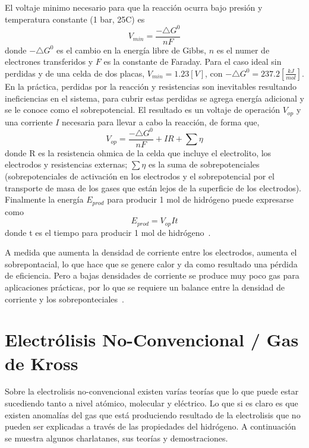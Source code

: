 \documentclass[12pt,twoside,onecolumn]{article}
\begin{document}
El voltaje minimo necesario para que la reacción ocurra bajo presión y temperatura constante (1 bar, 25C) es
\begin{equation}
V_{min} = \frac{-\triangle G^0}{nF} 
\end{equation}
donde $-\triangle G^0$ es el cambio en la energía libre de Gibbs, $n$ es el numer de electrones transferidos y $F$ es la constante de Faraday. Para el caso ideal sin perdidas y de una celda de dos placas, $V_{min}=1.23 [V]$, con $-\triangle G^0 = 237.2 [\frac{kJ}{mol}]$. En la práctica, perdidas por la reacción y resistencias son inevitables resultando ineficiencias en el sistema, para cubrir estas perdidas se agrega energía adicional y se le conoce como el sobrepotencial. El resultado es un voltaje de operación $V_{op}$ y una corriente $I$ necesaria para llevar a cabo la reacción, de forma que,
\begin{equation}
V_{op} =  \frac{-\triangle G^0}{nF} + IR + \sum\eta
\end{equation}  
donde R es la resistencia ohmica de la celda que incluye el electrolito, los electrodos y resistencias externas; $\sum\eta$ es la suma de sobrepotenciales (sobrepotenciales de activación en los electrodos y el sobrepotencial por el transporte de masa de los gases que están lejos de la superficie de los electrodos). Finalmente la energía $E_{prod}$ para producir 1 mol de hidrógeno puede expresarse como
\begin{equation}
E_{prod}=V_{op}It
\end{equation}
donde t es el tiempo para producir 1 mol de hidrógeno~\cite{kim2006water}.

A medida que aumenta la densidad de corriente entre los electrodos, aumenta el sobrepontacial, lo que hace que se genere calor y da como resultado una pérdida de eficiencia. Pero a bajas densidades de corriente se produce muy poco gas para aplicaciones prácticas, por lo que se requiere un balance entre la densidad de corriente y los sobreponteciales~\cite{zeng2010recent}.

\section{Electrólisis No-Convencional / Gas de Kross}
Sobre la electrolisis no-convencional existen varías teorías que lo que puede estar sucediendo tanto a nivel atómico, molecular y eléctrico. Lo que si es claro es que existen anomalías del gas que está produciendo resultado de la electrolisis que no pueden ser explicadas a través de las propiedades del hidrógeno. A continuación se muestra algunos charlatanes, sus teorías y demostraciones.
\end{document}

